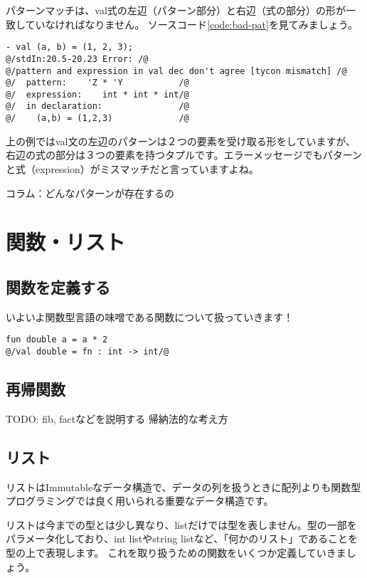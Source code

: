 \documentclass[11pt,a4paper]{article}
\begin{document}
パターンマッチは、val式の左辺（パターン部分）と右辺（式の部分）の形が一致していなければなりません。
ソースコード\ref{code:bad-pat}を見てみましょう。
\begin{lstlisting}[caption=型が合わないパターンマッチ,label=code:bad-pat]
- val (a, b) = (1, 2, 3);
@/stdIn:20.5-20.23 Error: /@
@/pattern and expression in val dec don't agree [tycon mismatch] /@
@/  pattern:    'Z * 'Y           /@
@/  expression:    int * int * int/@
@/  in declaration:               /@
@/    (a,b) = (1,2,3)             /@
\end{lstlisting}

上の例ではval文の左辺のパターンは２つの要素を受け取る形をしていますが、右辺の式の部分は３つの要素を持つタプルです。エラーメッセージでもパターンと式（expression）がミスマッチだと言っていますよね。

\begin{itembox}[l]{コラム：どんなパターンが存在するの}

\end{itembox}

\section{関数・リスト}
\subsection{関数を定義する}
いよいよ関数型言語の味噌である関数について扱っていきます！
\begin{lstlisting}[caption={単純な関数の定義},label={code:simple-funs}]
fun double a = a * 2
@/val double = fn : int -> int/@
\end{lstlisting}
\subsection{再帰関数}
TODO:
fib, factなどを説明する
帰納法的な考え方

\subsection{リスト}
リストはImmutableなデータ構造で、データの列を扱うときに配列よりも関数型プログラミングでは良く用いられる重要なデータ構造です。

リストは今までの型とは少し異なり、listだけでは型を表しません。型の一部をパラメータ化しており、int listやstring listなど、「何かのリスト」であることを型の上で表現します。
これを取り扱うための関数をいくつか定義していきましょう。
\end{document}
